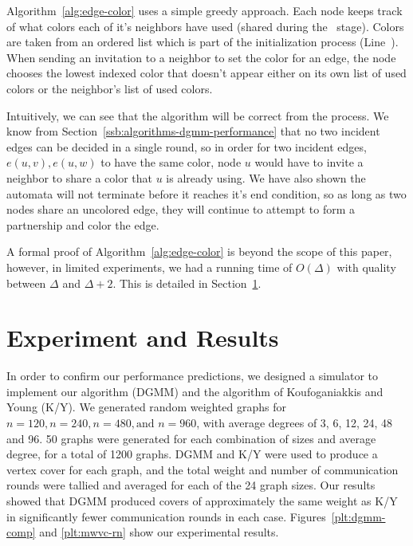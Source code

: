 \documentclass[conference, 10pt, letter]{IEEEtran}
\begin{document}


Algorithm~\ref{alg:edge-color} uses a simple greedy approach. Each node keeps track of what colors each of it's neighbors have used (shared during the \cEd\ stage). Colors are taken from an ordered list which is part of the initialization process (Line~). When sending an invitation to a neighbor to set the color for an edge, the node chooses the lowest indexed color that doesn't appear either on its own list of used colors or the neighbor's list of used colors.

Intuitively, we can see that the algorithm will be correct from the process. We know from Section~\ref{ssb:algorithms-dgmm-performance} that no two incident edges can be decided in a single round, so in order for two incident edges, $e(u,v), e(u,w)$ to have the same color, node $u$ would have to invite a neighbor to share a color that $u$ is already using. We have also shown the automata will not terminate before it reaches it's end condition, so as long as two nodes share an uncolored edge, they will continue to attempt to form a partnership and color the edge. 

A formal proof of Algorithm~\ref{alg:edge-color} is beyond the scope of this paper, however, in limited experiments, we had a running time of $O(\Delta)$ with quality between $\Delta$ and $\Delta+2$. This is detailed in Section~\ref{sec:experiment}.


\section{Experiment and Results}
\label{sec:experiment}
In order to confirm our performance predictions, we designed a simulator to implement our algorithm (DGMM) and the algorithm of Koufoganiakkis and Young (K/Y). We generated random weighted graphs for $n=120, n=240, n=480, \text{and } n=960$, with average degrees of 3, 6, 12, 24, 48 and 96. 50 graphs were generated for each combination of sizes and average degree, for a total of 1200 graphs. DGMM and K/Y were used to produce a vertex cover for each graph, and the total weight and number of communication rounds were tallied and averaged for each of the 24 graph sizes. Our results showed that DGMM produced covers of approximately the same weight as K/Y in significantly fewer communication rounds in each case. Figures~\ref{plt:dgmm-comp} and \ref{plt:mwvc-rn} show our experimental results.



\end{document}
